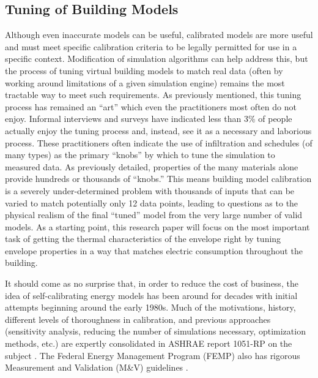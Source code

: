 \documentclass[preprint, review, 12pt]{elsarticle}
\begin{document}
\subsection{Tuning of Building Models}
Although even inaccurate models can be useful, calibrated models are more useful and must meet specific calibration criteria to be legally permitted for use in a specific context. Modification of simulation algorithms can help address this, but the process of tuning virtual building models to match real data (often by working around limitations of a given simulation engine) remains the most tractable way to meet such requirements. As previously mentioned, this tuning process has remained an ``art'' which even the practitioners most often do not enjoy. Informal interviews and surveys have indicated less than 3\% of people actually enjoy the tuning process and, instead, see it as a necessary and laborious process. These practitioners often indicate the use of infiltration and schedules (of many types) as the primary ``knobs'' by which to tune the simulation to measured data. As previously detailed, properties of the many materials alone provide hundreds or thousands of ``knobs.'' This means building model calibration is a severely under-determined problem with thousands of inputs that can be varied to match potentially only 12 data points, leading to questions as to the physical realism of the final ``tuned'' model from the very large number of valid models. As a starting point, this research paper will focus on the most important task of getting the thermal characteristics of the envelope right by tuning envelope properties in a way that matches electric consumption throughout the building.

It should come as no surprise that, in order to reduce the cost of business, the idea of self-calibrating energy models has been around for decades with initial attempts beginning around the early 1980s. Much of the motivations, history, different levels of thoroughness in calibration, and previous approaches (sensitivity analysis, reducing the number of simulations necessary, optimization methods, etc.) are expertly consolidated in ASHRAE report 1051-RP on the subject \cite{cit:reddy2006}. The Federal Energy Management Program (FEMP) also has rigorous Measurement and Validation (M\&V) guidelines \cite{cit:femp2008}.
\end{document}
